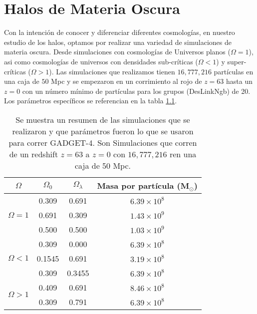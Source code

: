 \chapter{Halos de Materia Oscura}
\setcounter{equation}{0}

\noindent Con la intención de conocer y diferenciar diferentes cosmologías, en nuestro estudio de los halos, optamos por realizar una variedad de simulaciones de materia oscura. Desde simulaciones con cosmologías de Universos planos ($\Omega = 1$), asi como cosmologías  de universos con densidades sub-críticas ($\Omega < 1$) y super-críticas ($\Omega > 1$). Las simulaciones que realizamos {\blues tienen $16,777,216$ partículas en una caja de $50$ Mpc y se} empezaron en un corrimiento al rojo de $z=63$ hasta un $z=0$ {\blues con un número mínimo de partículas para los grupos (DesLinkNgb) de 20. Los parámetros específicos se referencian en la tabla \ref{tab:Resumen_Sim}.}

{\blues 
\begin{table}[H]
    \centering
    \begin{tabular}{|c|c|c|c|}
    
        \hline
        $\Omega$ & $\Omega_0$ & $\Omega_\lambda$ & Masa por partícula (M$_\odot$) \\ \hline
        \multirow{3}{*}{$\Omega = 1$} & 0.309 & 0.691 & $6.39 \times 10^8$ \\ \cline{2-4} 
         & 0.691 & 0.309 & $1.43 \times 10^9$ \\ \cline{2-4} 
         & 0.500 & 0.500 & $1.03 \times 10^9$ \\ \hline
        \multirow{3}{*}{$\Omega < 1$} & 0.309 & 0.000 & $6.39 \times 10^8$ \\ \cline{2-4} 
         & 0.1545 & 0.691 & $3.19 \times 10^8$ \\ \cline{2-4} 
         & 0.309 & 0.3455 & $6.39 \times 10^8$ \\ \hline
        \multirow{2}{*}{$\Omega > 1$} & 0.409 & 0.691 & $8.46 \times 10^8$ \\ \cline{2-4} 
         & 0.309 & 0.791 & $6.39 \times 10^8$ \\ \hline
    
    \end{tabular}
    
    \caption{Se muestra un resumen de las simulaciones que se realizaron y que parámetros fueron lo que se usaron para correr GADGET-4. Son Simulaciones que corren de un redshift $z=63$ a $z=0$ con $16,777,216$ ren una caja de 50 Mpc.}
    
    \label{tab:Resumen_Sim}

\end{table}
}

